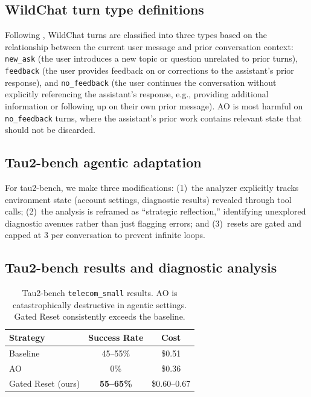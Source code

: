 \documentclass{article} %
\begin{document}
\subsection{WildChat turn type definitions}
\label{app:wildchat-turns}

Following \citet{huang2026context}, WildChat turns are classified into three types based on the relationship between the current user message and prior conversation context: \texttt{new\_ask} (the user introduces a new topic or question unrelated to prior turns), \texttt{feedback} (the user provides feedback on or corrections to the assistant's prior response), and \texttt{no\_feedback} (the user continues the conversation without explicitly referencing the assistant's response, e.g., providing additional information or following up on their own prior message). AO is most harmful on \texttt{no\_feedback} turns, where the assistant's prior work contains relevant state that should not be discarded.

\subsection{Tau2-bench agentic adaptation}
\label{app:agentic-methods}

For tau2-bench, we make three modifications: (1)~the analyzer explicitly tracks environment state (account settings, diagnostic results) revealed through tool calls; (2)~the analysis is reframed as ``strategic reflection,'' identifying unexplored diagnostic avenues rather than just flagging errors; and (3)~resets are gated and capped at 3 per conversation to prevent infinite loops.

\subsection{Tau2-bench results and diagnostic analysis}
\label{app:tau2-diagnostic}

\begin{table}[h]
\centering
\begin{tabular}{lcc}
\toprule
\textbf{Strategy} & \textbf{Success Rate} & \textbf{Cost} \\
\midrule
Baseline & 45--55\% & \$0.51 \\
AO & 0\% & \$0.36 \\
Gated Reset (ours) & \textbf{55--65\%} & \$0.60--0.67 \\
\bottomrule
\end{tabular}
\caption{Tau2-bench \texttt{telecom\_small} results. AO is catastrophically destructive in agentic settings. Gated Reset consistently exceeds the baseline.}
\label{tab:tau2-main}
\end{table}
\end{document}
